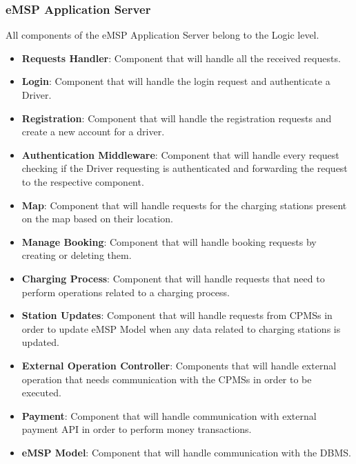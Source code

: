 \subsubsection{eMSP Application Server}
\label{emsPComponentView}
All components of the eMSP Application Server belong to the Logic level. 
\begin{itemize}
    \item \textbf{Requests Handler}: Component that will handle all the received requests.
    \item \textbf{Login}: Component that will handle the login request and authenticate a Driver.
    \item \textbf{Registration}: Component that will handle the registration requests and create a new account for a driver.
    \item \textbf{Authentication Middleware}: Component that will handle every request checking if the Driver requesting is authenticated and forwarding the request to the respective component.
    \item \textbf{Map}: Component that will handle requests for the charging stations present on the map based on their location.
    \item \textbf{Manage Booking}: Component that will handle booking requests by creating or deleting them.
    \item \textbf{Charging Process}: Component that will handle requests that need to perform operations related to a charging process.
    \item \textbf{Station Updates}: Component that will handle requests from CPMSs in order to update eMSP Model when any data related to charging stations is updated.
    \item \textbf{External Operation Controller}: Components that will handle external operation that needs communication with the CPMSs in order to be executed.
    \item \textbf{Payment}: Component that will handle communication with external payment API in order to perform money transactions.
    \item \textbf{eMSP Model}: Component that will handle communication with the DBMS.
\end{itemize}

